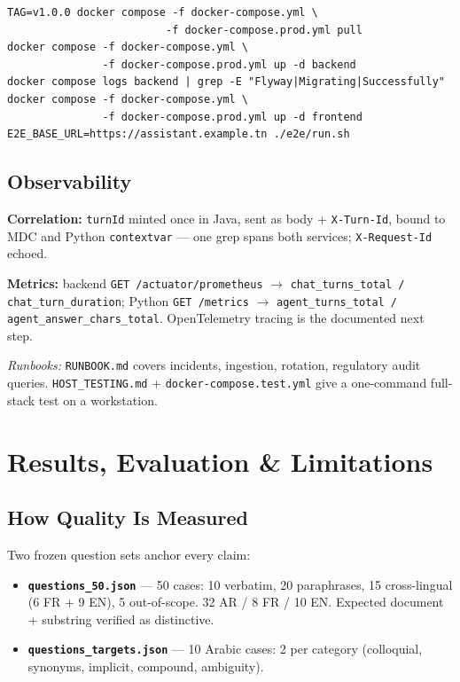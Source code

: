\documentclass[a4paper,12pt]{report}
\begin{document}
\begin{verbatim}
TAG=v1.0.0 docker compose -f docker-compose.yml \
                         -f docker-compose.prod.yml pull
docker compose -f docker-compose.yml \
               -f docker-compose.prod.yml up -d backend
docker compose logs backend | grep -E "Flyway|Migrating|Successfully"
docker compose -f docker-compose.yml \
               -f docker-compose.prod.yml up -d frontend
E2E_BASE_URL=https://assistant.example.tn ./e2e/run.sh
\end{verbatim}

\section{Observability}

\textbf{Correlation:} \texttt{turnId} minted once in Java, sent as body + \texttt{X-Turn-Id}, bound to MDC and Python \texttt{contextvar} --- one grep spans both services; \texttt{X-Request-Id} echoed.

\textbf{Metrics:} backend \texttt{GET /actuator/prometheus} $\rightarrow$ \texttt{chat\_turns\_total / chat\_turn\_duration}; Python \texttt{GET /metrics} $\rightarrow$ \texttt{agent\_turns\_total / agent\_answer\_chars\_total}. OpenTelemetry tracing is the documented next step.

\noindent\textit{Runbooks:} \texttt{RUNBOOK.md} covers incidents, ingestion, rotation, regulatory audit queries. \texttt{HOST\_TESTING.md} + \texttt{docker-compose.test.yml} give a one-command full-stack test on a workstation.

\chapter{Results, Evaluation \& Limitations}

\section{How Quality Is Measured}

Two frozen question sets anchor every claim:

\begin{itemize}[leftmargin=1.2cm, itemsep=2pt]
\item \textbf{\texttt{questions\_50.json}} --- 50 cases: 10 verbatim, 20 paraphrases, 15 cross-lingual (6 FR + 9 EN), 5 out-of-scope. 32 AR / 8 FR / 10 EN. Expected document + substring verified as distinctive.
\item \textbf{\texttt{questions\_targets.json}} --- 10 Arabic cases: 2 per category (colloquial, synonyms, implicit, compound, ambiguity).
\end{itemize}
\end{document}
